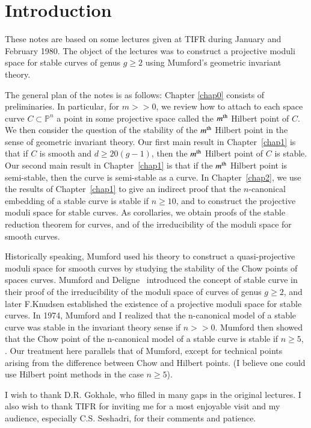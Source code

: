 \chapter{Introduction}

These notes are based on some lectures given at TIFR during January
and February 1980. The object of the lectures was to construct a
projective moduli space for stable curves of genus $g \ge 2$ using
Mumford's geometric invariant theory. 

The general plan of the notes is as follows: Chapter \ref{chap0} consists of
preliminaries. In particular, for $m > > 0$, we review how to attach to
each space curve $C \subset \mathbb{P}^n$ a point in some projective
space called the $m^{\rm th}$ Hilbert point of $C$. We then consider the
question of the stability of the $m^{\rm th}$ Hilbert point in the sense
of geometric invariant theory. Our first main result in Chapter~\ref{chap1} is
that if $C$ is smooth and $d \ge 20(g-1)$, then the $m^{\rm th}$ Hilbert
point of $C$ is stable. Our second main result in Chapter~\ref{chap1} is that
if the $m^{\rm th}$ Hilbert point is semi-stable, then the curve is
semi-stable as a curve. In Chapter~\ref{chap2}, we use the results of 
Chapter~\ref{chap1} to give an indirect proof that the $n$-canonical embedding of a
stable curve is stable if $n \ge 10$, and to construct the projective
moduli space for stable curves. As corollaries, we obtain proofs of
the stable reduction theorem for curves, and of the irreducibility of
the moduli space for smooth curves. 

Historically speaking, Mumford used his theory to construct a
quasi-projective moduli space for smooth curves by studying the
stability of the Chow points of spaces curves. Mumford and 
Deligne~\cite{key1} introduced the concept of stable curve in their proof of the
irreducibility of the moduli space of curves of genus $g \ge 2$, and
later F.Knudsen established the existence of a projective moduli space
for stable curves. In 1974, Mumford and I realized that the
n-canonical model of a stable curve was stable in the invariant theory
sense if $n > > 0$. Mumford then showed that the Chow point of the
n-canonical model of a stable curve is stable if $n\ge 5$, \cite{key7}. Our
treatment here parallels that of Mumford, except for technical points
arising from the difference between Chow and Hilbert points. (I
believe one could use Hilbert point methods in the case $n \ge 5$). 

I wish to thank D.R. Gokhale, who filled in many gaps in the original
lectures. I also wish to thank TIFR for inviting me for a most
enjoyable visit and my audience, especially C.S. Seshadri, for their
comments and patience. 


